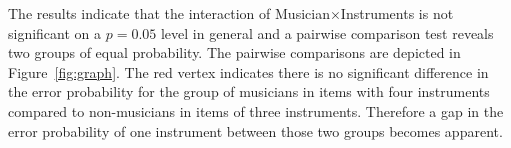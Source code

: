 The results indicate that the interaction of Musician$\times$Instruments is not significant on a $p=0.05$ level in general and a pairwise comparison test reveals two groups of equal probability. The pairwise comparisons are depicted in Figure~\ref{fig:graph}. The red vertex indicates there is no significant difference in the error probability for the group of musicians in items with four instruments compared to non-musicians in items of three instruments. Therefore a gap in the error probability of one instrument between those two groups becomes apparent.

